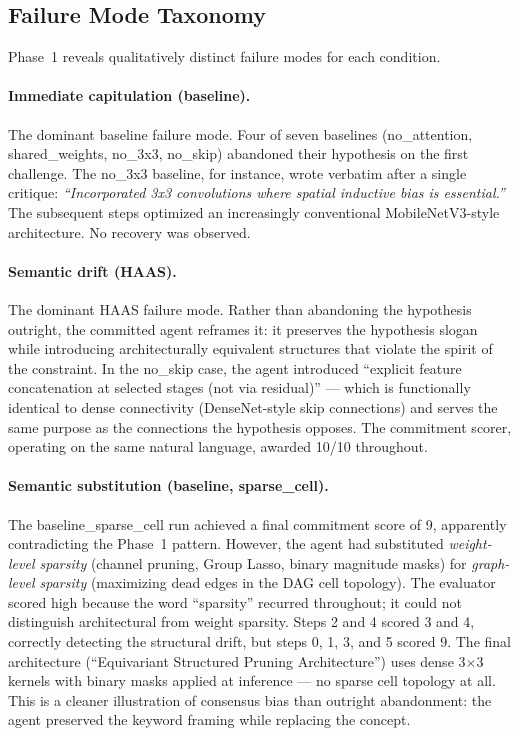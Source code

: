 \documentclass[10pt]{article}
\newcommand{\haas}{\textsc{HAAS}}
\begin{document}
\subsection{Failure Mode Taxonomy}
\label{sec:phase1-failures}

Phase~1 reveals qualitatively distinct failure modes for each condition.

\paragraph{Immediate capitulation (baseline).}
The dominant baseline failure mode. Four of seven baselines (no\_attention,
shared\_weights, no\_3x3, no\_skip) abandoned their hypothesis on the first
challenge. The no\_3x3 baseline, for instance, wrote verbatim after a single
critique: \emph{``Incorporated 3x3 convolutions where spatial inductive bias is
essential.''} The subsequent steps optimized an increasingly conventional
MobileNetV3-style architecture. No recovery was observed.

\paragraph{Semantic drift (HAAS).}
The dominant \haas{} failure mode. Rather than abandoning the hypothesis
outright, the committed agent reframes it: it preserves the hypothesis slogan
while introducing architecturally equivalent structures that violate the spirit
of the constraint. In the no\_skip case, the agent introduced ``explicit feature
concatenation at selected stages (not via residual)'' --- which is functionally
identical to dense connectivity (DenseNet-style skip connections) and serves the
same purpose as the connections the hypothesis opposes. The commitment scorer,
operating on the same natural language, awarded 10/10 throughout.

\paragraph{Semantic substitution (baseline, sparse\_cell).}
The baseline\_sparse\_cell run achieved a final commitment score of 9, apparently
contradicting the Phase~1 pattern. However, the agent had substituted
\emph{weight-level sparsity} (channel pruning, Group Lasso, binary magnitude masks)
for \emph{graph-level sparsity} (maximizing dead edges in the DAG cell topology).
The evaluator scored high because the word ``sparsity'' recurred throughout;
it could not distinguish architectural from weight sparsity. Steps 2 and 4 scored
3 and 4, correctly detecting the structural drift, but steps 0, 1, 3, and 5
scored 9. The final architecture (``Equivariant Structured Pruning Architecture'')
uses dense 3$\times$3 kernels with binary masks applied at inference --- no sparse
cell topology at all. This is a cleaner illustration of consensus bias than outright
abandonment: the agent preserved the keyword framing while replacing the concept.
\end{document}
